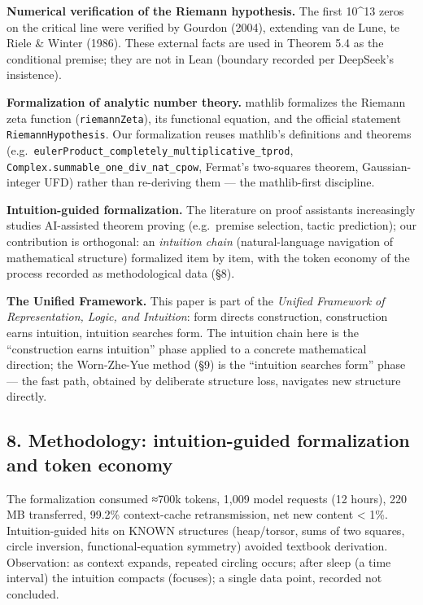 \documentclass[
]{article}
\begin{document}
\textbf{Numerical verification of the Riemann hypothesis.} The first
10\^{}13 zeros on the critical line were verified by Gourdon (2004),
extending van de Lune, te Riele \& Winter (1986). These external facts
are used in Theorem 5.4 as the conditional premise; they are not in Lean
(boundary recorded per DeepSeek's insistence).

\textbf{Formalization of analytic number theory.} mathlib formalizes the
Riemann zeta function (\texttt{riemannZeta}), its functional equation,
and the official statement \texttt{RiemannHypothesis}. Our formalization
reuses mathlib's definitions and theorems
(e.g.~\texttt{eulerProduct\_completely\_multiplicative\_tprod},
\texttt{Complex.summable\_one\_div\_nat\_cpow}, Fermat's two-squares
theorem, Gaussian-integer UFD) rather than re-deriving them --- the
mathlib-first discipline.

\textbf{Intuition-guided formalization.} The literature on proof
assistants increasingly studies AI-assisted theorem proving
(e.g.~premise selection, tactic prediction); our contribution is
orthogonal: an \emph{intuition chain} (natural-language navigation of
mathematical structure) formalized item by item, with the token economy
of the process recorded as methodological data (§8).

\textbf{The Unified Framework.} This paper is part of the \emph{Unified
Framework of Representation, Logic, and Intuition}: form directs
construction, construction earns intuition, intuition searches form. The
intuition chain here is the ``construction earns intuition'' phase
applied to a concrete mathematical direction; the Worn-Zhe-Yue method
(§9) is the ``intuition searches form'' phase --- the fast path,
obtained by deliberate structure loss, navigates new structure directly.

\subsection{8. Methodology: intuition-guided formalization and token
economy}\label{methodology-intuition-guided-formalization-and-token-economy}

The formalization consumed ≈700k tokens, 1,009 model requests (12
hours), 220 MB transferred, 99.2\% context-cache retransmission, net new
content \textless{} 1\%. Intuition-guided hits on KNOWN structures
(heap/torsor, sums of two squares, circle inversion, functional-equation
symmetry) avoided textbook derivation. Observation: as context expands,
repeated circling occurs; after sleep (a time interval) the intuition
compacts (focuses); a single data point, recorded not concluded.
\end{document}
